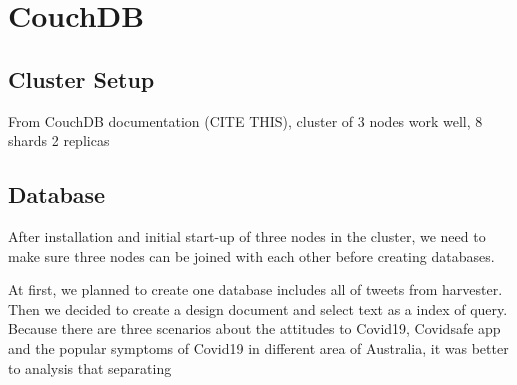 \section{CouchDB}
\subsection{Cluster Setup}
 From CouchDB documentation (CITE THIS), cluster of 3 nodes work well, 8 shards 2 replicas 

\subsection{Database} 
After installation and initial start-up of three nodes in the cluster, we need to make sure three nodes can be joined with each other before creating databases. 

At first, we planned to create one database includes all of tweets from harvester. Then we decided to create a design document and select text as a index of query. Because there are three scenarios about the attitudes to Covid19, Covidsafe app and the popular symptoms of Covid19 in different area of Australia, it was better to analysis that separating  
